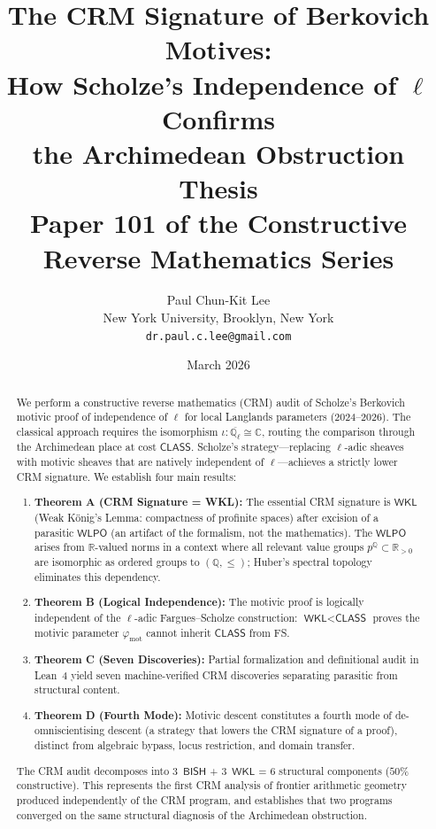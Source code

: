 \documentclass[11pt,a4paper]{article}
\title{\textbf{The CRM Signature of Berkovich Motives:\\
How Scholze's Independence of $\ell$ Confirms\\
the Archimedean Obstruction Thesis}\\[6pt]
\large Paper 101 of the Constructive Reverse Mathematics Series}
\author{Paul Chun-Kit Lee\\
\small New York University, Brooklyn, New York\\
\small\texttt{dr.paul.c.lee@gmail.com}}
\date{March 2026}
\theoremstyle{plain}
\theoremstyle{definition}
\newcommand{\BISH}{\textsf{BISH}}
\newcommand{\WKL}{\textsf{WKL}}
\newcommand{\WLPO}{\textsf{WLPO}}
\newcommand{\CLASS}{\textsf{CLASS}}
\newcommand{\Q}{\mathbb{Q}}
\newcommand{\R}{\mathbb{R}}
\newcommand{\C}{\mathbb{C}}
\begin{document}
\maketitle

\begin{abstract}
We perform a constructive reverse mathematics (CRM) audit of Scholze's Berkovich motivic proof of independence of $\ell$ for local Langlands parameters (2024--2026). The classical approach requires the isomorphism $\iota: \overline{\Q_\ell} \cong \C$, routing the comparison through the Archimedean place at cost $\CLASS$. Scholze's strategy---replacing $\ell$-adic sheaves with motivic sheaves that are natively independent of $\ell$---achieves a strictly lower CRM signature. We establish four main results:

\begin{enumerate}[label=(\roman*)]
\item \textbf{Theorem A (CRM Signature = WKL):} The essential CRM signature is $\WKL$ (Weak K\"onig's Lemma: compactness of profinite spaces) after excision of a parasitic $\WLPO$ (an artifact of the formalism, not the mathematics). The $\WLPO$ arises from $\R$-valued norms in a context where all relevant value groups $p^{\Q} \subset \R_{>0}$ are isomorphic as ordered groups to $(\Q, \leq)$; Huber's spectral topology eliminates this dependency.
\item \textbf{Theorem B (Logical Independence):} The motivic proof is logically independent of the $\ell$-adic Fargues--Scholze construction: $\WKL < \CLASS$ proves the motivic parameter $\varphi_{\mathrm{mot}}$ cannot inherit $\CLASS$ from FS.
\item \textbf{Theorem C (Seven Discoveries):} Partial formalization and definitional audit in Lean~4 yield seven machine-verified CRM discoveries separating parasitic from structural content.
\item \textbf{Theorem D (Fourth Mode):} Motivic descent constitutes a fourth mode of de-omniscientising descent (a strategy that lowers the CRM signature of a proof), distinct from algebraic bypass, locus restriction, and domain transfer.
\end{enumerate}

The CRM audit decomposes into 3~$\BISH$ + 3~$\WKL$ = 6 structural components ($50\%$ constructive). This represents the first CRM analysis of frontier arithmetic geometry produced independently of the CRM program, and establishes that two programs converged on the same structural diagnosis of the Archimedean obstruction.
\end{abstract}
\end{document}

